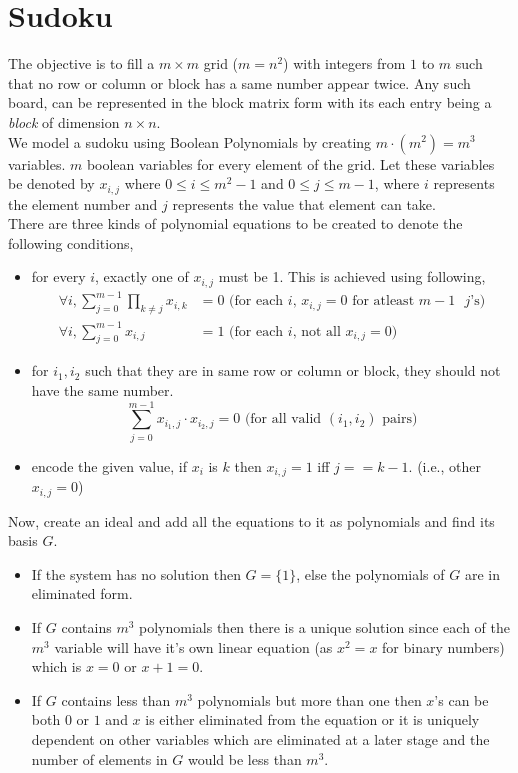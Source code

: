 \documentclass[a4paper,11pt]{article}
\begin{document}
\section{Sudoku}
The objective is to fill a $m\times m$ grid ($m=n^2$) with integers from $1$ to $m$ such that no row or column or block has a same number appear twice. Any such board, can be represented in the block matrix form with its each entry being a \emph{block} of dimension $n\times n$.\\
We model a sudoku using Boolean Polynomials by creating $m\cdot (m^2)=m^3$ variables. $m$ boolean variables for every element of the grid. Let these variables be denoted by $x_{i,j}$ where $0\leq i\leq m^2-1$ and $0\leq j \leq m-1$, where $i$ represents the element number and $j$ represents the value that element can take.\\
There are three kinds of polynomial equations to be created to denote the following conditions,
\begin{itemize}
    \item for every $i$, exactly one of $x_{i,j}$ must be 1. This is achieved using following,
    \begin{equation}
        \begin{aligned}
            \forall i, \sum_{j=0}^{m-1}\prod_{k\neq j} x_{i,k} &= 0 \text{ (for each $i$, $x_{i,j} = 0$ for atleast $m-1$\ $j$'s)}\\
            \forall i, \sum_{j=0}^{m-1} x_{i,j} &= 1 \text{ (for each $i$, not all $x_{i,j} = 0$) }
        \end{aligned}
    \end{equation}
    \item for $i_1,i_2$ such that they are in same row or column or block, they should not have the same number.
    \begin{equation}
        \sum_{j=0}^{m-1} x_{i_1,j}\cdot x_{i_2,j} = 0 \text{ (for all valid  $(i_1, i_2)$ pairs)}
    \end{equation}
    \item encode the given value, if $x_i$ is $k$ then $x_{i,j}=1$ iff $j==k-1$. (i.e., other $x_{i,j}=0$)
\end{itemize}
Now, create an ideal and add all the equations to it as polynomials and find its \Grob basis $G$.
\begin{itemize}
    \item If the system has no solution then $G=\{1\}$, else the polynomials of $G$ are in eliminated form.
    \item If $G$ contains $m^3$ polynomials then there is a unique solution since each of the $m^3$ variable will have it's own linear equation (as $x^2=x$ for binary numbers) which is $x=0$ or $x+1=0$.
    \item If $G$ contains less than $m^3$ polynomials but more than one then $x$'s can be both $0$ or $1$ and $x$ is either eliminated from the equation or it is uniquely dependent on other variables which are eliminated at a later stage  and the number of elements in $G$ would be less than $m^3$.
\end{itemize}
\end{document}
